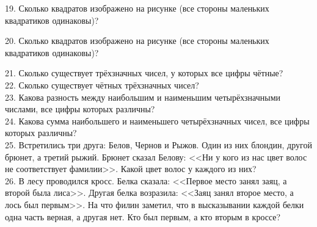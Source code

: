 \documentclass[12pt]{article}
\begin{document}
19. Сколько квадратов изображено на рисунке (все стороны маленьких квадратиков одинаковы)?
\begin{center}
\begin{figure}[ht!]
\end{figure}
\end{center}
20. Сколько квадратов изображено на рисунке (все стороны маленьких квадратиков одинаковы)?
\begin{center}
\begin{figure}[ht!]
\end{figure}
\end{center}
21. Сколько существует трёхзначных чисел, у которых все цифры чётные?\\
22. Сколько существует чётных трёхзначных чисел?\\
23. Какова разность между наибольшим и наименьшим четырёхзначными числами, все цифры которых различны?\\
24. Какова сумма наибольшего и наименьшего четырёхзначных чисел, все цифры которых различны?\\
25. Встретились три друга: Белов, Чернов и Рыжов. Один из них блондин, другой брюнет, а третий рыжий. Брюнет сказал Белову: <<Ни у кого из нас цвет волос не соответствует фамилии>>. Какой цвет волос у каждого из них?\\
26. В лесу проводился кросс. Белка сказала: <<Первое место занял заяц, а второй была лиса>>. Другая белка возразила: <<Заяц занял второе место, а лось был первым>>. На что филин заметил, что в высказывании каждой белки одна часть верная, а другая нет. Кто был первым, а кто вторым в кроссе?\\
\end{document}
